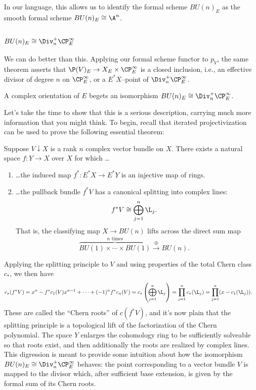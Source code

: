 \noindent In our language, this allows us to identify the formal scheme $BU(n)_E$ as the smooth formal scheme $BU(n)_E \cong \A^n$.


\subsection*{$BU(n)_E \cong \Div_n^+ \CP^\infty_E$}

We can do better than this.  Applying our formal scheme functor to $p_V$, the same theorem asserts that $\P(V)_E \to X_E \times \CP^\infty_E$ is a closed inclusion, i.e., an effective divisor of degree $n$ on $\CP^\infty_E$, or a $E^* X$--point of $\Div_n^+ \CP^\infty_E$.

\begin{theorem}
A complex orientation of $E$ begets an isomorphism $BU(n)_E \cong \Div_n^+ \CP^\infty_E$.
\end{theorem}

\noindent Let's take the time to show that this is a serious description, carrying much more information that you might think. To begin, recall that iterated projectivization can be used to prove the following essential theorem:

\begin{theorem}
Suppose $V \downarrow X$ is a rank $n$ complex vector bundle on $X$.  There exists a natural space $f: Y \to X$ over $X$ for which \ldots
\begin{enumerate}
\item \ldots the induced map $f^*: E^* X \to E^* Y$ is an injective map of rings.
\item \ldots the pullback bundle $f^* V$ has a canonical splitting into complex lines: \[f^* V \cong \bigoplus_{j=1}^n \L_j.\]  That is, the classifying map $X \to BU(n)$ lifts across the direct sum map \[\overset{\text{$n$ times}}{\overbrace{BU(1) \times \cdots \times BU(1)}} \xrightarrow{\oplus} BU(n).\]
\end{enumerate}
\end{theorem}

Applying the splitting principle to $V$ and using properties of the total Chern class $c_*$, we then have
\[
c_*(f^* V) = x^n - f^* c_1(V) x^{n-1} + \cdots + (-1)^n f^* c_n(V) = c_*\left( \bigoplus_{j=1}^n \L_j \right) = \prod_{j=1}^n c_*(\L_j) = \prod_{j=1}^n (x - c_1(\L_j)).
\]
These are called the ``Chern roots'' of $c(f^* V)$, and it's now plain that the splitting principle is a topological lift of the factorization of the Chern polynomial.  The space $Y$ enlarges the cohomology ring to be sufficiently solveable so that roots exist, and then additionally the roots are realized by complex lines.  This digression is meant to provide some intuition about how the isomorphism $BU(n)_E \cong \Div_n^+ \CP^\infty_E$ behaves: the point corresponding to a vector bundle $V$ is mapped to the divisor which, after sufficient base extension, is given by the formal sum of its Chern roots.

